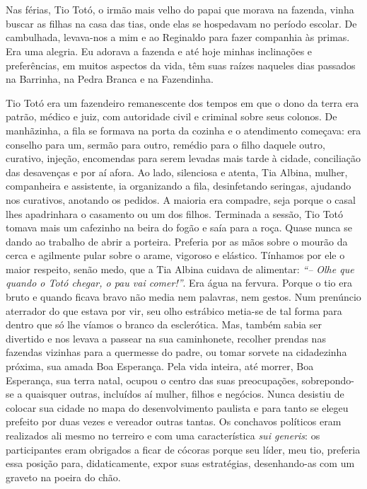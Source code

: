 \chapter{}
Nas férias, Tio Totó, o irmão mais velho do papai que morava na fazenda, vinha buscar as filhas na casa das tias, onde elas se hospedavam no período escolar.
De cambulhada, levava-nos a mim e ao Reginaldo para fazer companhia às primas.
Era uma alegria.
Eu adorava a fazenda e até hoje minhas inclinações e preferências, em muitos aspectos da vida, têm suas raízes naqueles dias passados na Barrinha, na Pedra Branca e na Fazendinha.

Tio Totó era um fazendeiro remanescente dos tempos em que o dono da terra era patrão, médico e juiz, com autoridade civil e criminal sobre seus colonos.
De manhãzinha, a fila se formava na porta da cozinha e o atendimento começava: era conselho para um, sermão para outro, remédio para o filho daquele outro, curativo, injeção, encomendas para serem levadas mais tarde à cidade, conciliação das desavenças e por aí afora.
Ao lado, silenciosa e atenta, Tia Albina, mulher, companheira e assistente, ia organizando a fila, desinfetando seringas, ajudando nos curativos, anotando os pedidos.
A maioria era compadre, seja porque o casal lhes apadrinhara o casamento ou um dos filhos. Terminada a sessão, Tio Totó tomava mais um cafezinho na beira do fogão e saía para a roça.
Quase nunca se dando ao trabalho de abrir a porteira.
Preferia por as mãos sobre o mourão da cerca e agilmente pular sobre o arame, vigoroso e elástico.
Tínhamos por ele o maior respeito, senão medo, que a Tia Albina cuidava de alimentar: \textit{``-- Olhe que quando o Totó chegar, o pau vai comer!''}. Era água na fervura.
Porque o tio era bruto e quando ficava bravo não media nem palavras, nem gestos.
Num prenúncio aterrador do que estava por vir, seu olho estrábico metia-se de tal forma para dentro que só lhe víamos o branco da esclerótica.
Mas, também sabia ser divertido e nos levava a passear na sua caminhonete, recolher prendas nas fazendas vizinhas para a quermesse do padre, ou tomar sorvete na cidadezinha próxima, sua amada Boa Esperança.
Pela vida inteira, até morrer, Boa Esperança, sua terra natal, ocupou o centro das suas preocupações, sobrepondo-se a quaisquer outras, incluídos aí mulher, filhos e negócios.
Nunca desistiu de colocar sua cidade no mapa do desenvolvimento paulista e para tanto se elegeu prefeito por duas vezes e vereador outras tantas.
Os conchavos políticos eram realizados ali mesmo no terreiro e com uma característica \textit{sui generis}: os participantes eram obrigados a ficar de cócoras porque seu líder, meu tio, preferia essa posição para, didaticamente, expor suas estratégias, desenhando-as com um graveto na poeira do chão.

